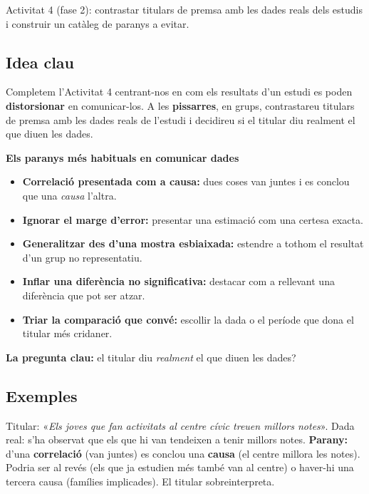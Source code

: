 %
{Activitat 4 (fase 2): contrastar titulars de premsa amb les dades reals dels estudis i construir un catàleg de paranys a evitar.}

\subsection{Idea clau}

Completem l'Activitat 4 centrant-nos en com els resultats d'un estudi es poden
\textbf{distorsionar} en comunicar-los. A les \textbf{pissarres}, en grups, contrastareu
titulars de premsa amb les dades reals de l'estudi i decidireu si el titular diu realment
el que diuen les dades.

\begin{idea}
\textbf{Els paranys més habituals en comunicar dades}
\begin{itemize}[leftmargin=1.4em, itemsep=2pt]
  \item \textbf{Correlació presentada com a causa:} dues coses van juntes i es conclou que
        una \emph{causa} l'altra.
  \item \textbf{Ignorar el marge d'error:} presentar una estimació com una certesa exacta.
  \item \textbf{Generalitzar des d'una mostra esbiaixada:} estendre a tothom el resultat
        d'un grup no representatiu.
  \item \textbf{Inflar una diferència no significativa:} destacar com a rellevant una
        diferència que pot ser atzar.
  \item \textbf{Triar la comparació que convé:} escollir la dada o el període que dona el
        titular més cridaner.
\end{itemize}
\textbf{La pregunta clau:} el titular diu \emph{realment} el que diuen les dades?
\end{idea}

\subsection{Exemples}

\begin{exemple}
Titular: «\emph{Els joves que fan activitats al centre cívic treuen millors notes}». Dada
real: s'ha observat que els que hi van tendeixen a tenir millors notes. \textbf{Parany:}
d'una \textbf{correlació} (van juntes) es conclou una \textbf{causa} (el centre millora les
notes). Podria ser al revés (els que ja estudien més també van al centre) o haver-hi una
tercera causa (famílies implicades). El titular sobreinterpreta.
\end{exemple}

